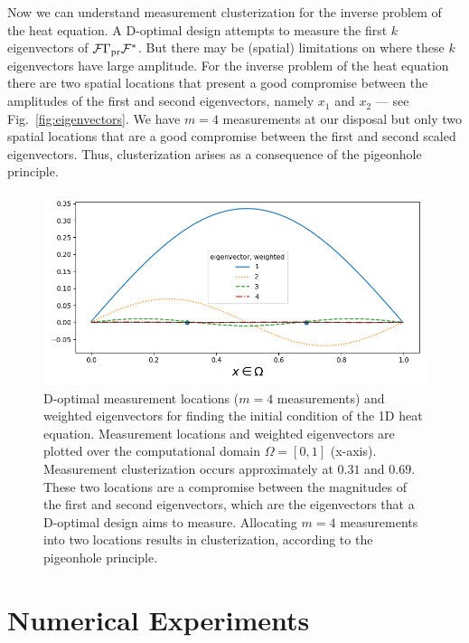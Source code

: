\documentclass[ba]{imsart}
\newcommand{\fwd}{\mathcal{F}}
\theoremstyle{plain}
\theoremstyle{definition}
\theoremstyle{remark}
\begin{document}
Now we can understand measurement clusterization for the inverse
problem of the heat equation. A D-optimal design attempts to measure
the first $k$ eigenvectors of $\fwd \prcov \fwd^*$. But there may be
(spatial) limitations on where these $k$ eigenvectors have large
amplitude. For the inverse problem of the heat equation there are two
spatial locations that present a good compromise between the
amplitudes of the first and second eigenvectors, namely $x_1$ and
$x_2$ --- see Fig.~\ref{fig:eigenvectors}. We have $m=4$ measurements
at our disposal but only two spatial locations that are a good
compromise between the first and second scaled eigenvectors. Thus,
clusterization arises as a consequence of the pigeonhole principle.

\begin{figure}\label{fig:eigenvectors}
    \centering
    \includegraphics[width=\textwidth]{figs/eigenvectors_dst_scaled.png}
    \caption{D-optimal measurement locations ($m=4$ measurements) and
      weighted eigenvectors for finding the initial condition of the
      1D heat equation. Measurement locations and weighted
      eigenvectors are plotted over the computational domain $\Omega =
      [0, 1]$ (x-axis). Measurement clusterization occurs
      approximately at $0.31$ and $0.69$. These two locations are a
      compromise between the magnitudes of the first and second
      eigenvectors, which are the eigenvectors that a D-optimal design
      aims to measure. Allocating $m=4$ measurements into two
      locations results in clusterization, according to the pigeonhole
      principle.}
  \label{fig:why}
\end{figure}
 \section{Numerical Experiments}
\end{document}
